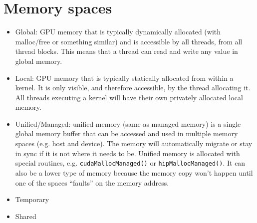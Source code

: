 \documentclass[a4paper,11pt]{article}
\begin{document}
\section{Memory spaces}
\begin{itemize}
    \item Global: GPU memory that is typically dynamically allocated (with malloc/free or something similar) and is accessible by all threads, from all thread blocks. This means that a thread can read and write any value in global memory.
    \item Local: GPU memory that is typically statically allocated from within a kernel. It is only visible, and therefore accessible, by the thread allocating it. All threads executing a kernel will have their own privately allocated local memory.
    \item Unified/Managed: unified memory (same as managed memory) is a single global memory buffer that can be accessed and used in multiple memory spaces (e.g. host and device). The memory will automatically migrate or stay in sync if it is not where it needs to be. Unified memory is allocated with special routines, e.g. \texttt{cudaMallocManaged()} or \texttt{hipMallocManaged()}. It can also be a lower type of memory because the memory copy won't happen until one of the spaces ``faults'' on the memory address.
    \item Temporary
    \item Shared
\end{itemize}

\end{document}
